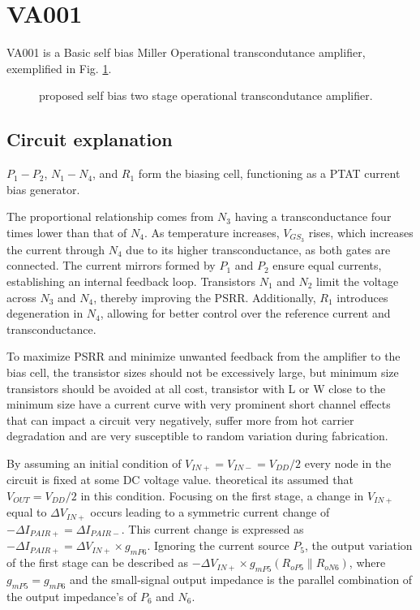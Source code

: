 \documentclass[12pt]{article}
\begin{document}
\section{VA001}
VA001 is a Basic self bias Miller Operational transcondutance amplifier, exemplified in Fig. \ref{VA001}.


\begin{figure}[H]
        \centering
        
        \caption{proposed self bias two stage operational transcondutance amplifier.}
        \label{VA001}
\end{figure}
\subsection{Circuit explanation}
$P_1 - P_2$, $N_1 - N_4$, and $R_1$ form the biasing cell, functioning as a PTAT current bias generator.  

The proportional relationship comes from $N_3$ having a transconductance four times lower than that of $N_4$. As temperature increases, $V_{GS_3}$ rises, which increases the current through $N_4$ due to its higher transconductance, as both gates are connected. The current mirrors formed by $P_1$ and $P_2$ ensure equal currents, establishing an internal feedback loop. Transistors $N_1$ and $N_2$ limit the voltage across $N_3$ and $N_4$, thereby improving the PSRR. Additionally, $R_1$ introduces degeneration in $N_4$, allowing for better control over the reference current and transconductance.

To maximize PSRR and minimize unwanted feedback from the amplifier to the bias cell, the transistor sizes should not be excessively large, but minimum size transistors should be avoided at all cost, transistor with L or W close to the minimum size have a current curve with very prominent short channel effects that can impact a circuit very negatively, suffer more from hot carrier degradation and are very susceptible to random variation during fabrication. 


By assuming an initial condition of $V_{IN+} = V_{IN-} = V_{DD}/2$ every node in the circuit is fixed at some DC voltage value.  theoretical its assumed that $V_{OUT}=V_{DD}/2$ in this condition.
Focusing on the first stage, a change in $V_{IN+}$ equal to $\Delta V_{IN+}$ occurs leading to a symmetric current change of $-\Delta I_{PAIR+} = \Delta I_{PAIR-}$. This current change is expressed as $-\Delta I_{PAIR+} = \Delta V_{IN+} \times g_{mP6}$. Ignoring the current source $P_5$, the output variation of the first stage can be described as $-\Delta V_{IN+} \times g_{mP5} (R_{oP5} \parallel R_{oN6})$, where $g_{mP5} = g_{mP6}$ and the small-signal output impedance is the parallel combination of the output impedance's of $P_6$ and $N_6$.
\end{document}
